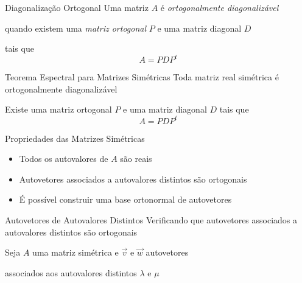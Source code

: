 \documentclass[fleqn,aspectratio=169,12pt]{beamer}
\begin{document}
\begin{frame}{Diagonalização Ortogonal}
  Uma matriz $A$ é \emph{ortogonalmente diagonalizável}

  \pause
  quando existem uma \emph{matriz ortogonal} $P$ e uma matriz diagonal $D$

  \pause
  tais que
  \[
    A = PDP^t
  \]
\end{frame}

\begin{frame}{Teorema Espectral para Matrizes Simétricas}
  Toda matriz real simétrica é ortogonalmente diagonalizável

  \pause
  \bigskip
  Existe uma matriz ortogonal $P$ e uma matriz diagonal $D$ tais que
  \[
    A = PDP^t
  \]
\end{frame}

\begin{frame}{Propriedades das Matrizes Simétricas}
  \begin{itemize}[<+->]
    \setlength{\itemsep}{2em}
    \item Todos os autovalores de $A$ são reais
    \item Autovetores associados a autovalores distintos são ortogonais
    \item É possível construir uma base ortonormal de autovetores
  \end{itemize}
\end{frame}

\begin{proofframe}{Autovetores de Autovalores Distintos}
  Verificando que autovetores associados a autovalores distintos são ortogonais

  \pause
  \bigskip
  Seja $A$ uma matriz simétrica e $\vec{v}$ e $\vec{w}$ autovetores

  \pause
  associados aos autovalores distintos $\lambda$ e $\mu$
\end{proofframe}
\end{document}
